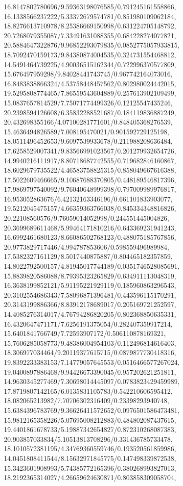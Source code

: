 {16.8147802780696/9.59363198076585/0.791245161558866,
16.1338566237222/5.33372679574781/0.851980109062184,
18.8276613710978/8.25386669150998/0.631224705148792,
20.7268079355087/7.33491631088355/0.684228274077821,
20.5884647322876/9.96852293079835/0.0852775057933815,
18.7092470159173/9.84380874004535/0.324731554468812,
14.5491464739225/4.90036515162344/0.722996370577809,
15.676497959298/9.84028441743745/0.967742164073016,
16.8483838866324/4.53758448457562/0.802980024442015,
19.5295808774465/7.86559543604889/0.257613902109499,
15.0837657814529/7.75071774499326/0.12125547435246,
20.2398594126608/6.35832288521687/0.184119836887249,
20.432698355166/4.07100281771601/0.848405368276539,
15.4636494826589/7.008195470021/0.901592729125198,
18.0511496452653/9.6097539933678/0.211988208636484,
17.6258529007341/9.83566991023567/0.201279932654726,
14.9940216111917/8.80718687742555/0.719682846160867,
18.6029679735522/4.46583758825315/0.858049667616388,
17.5022609466665/9.10687688370805/0.448189546817396,
17.9869797540092/9.76040648999398/0.797009989976817,
16.953052863676/6.42132163346196/0.661101833903077,
19.5212045475157/4.66359363766038/0.845334348816826,
20.22108560576/9.76059014052998/0.244551445004826,
20.3699689611468/5.99464171810216/0.643369231941243,
16.6992461680123/8.66086502768123/0.488075185767856,
20.9773829717446/4.994787853606/0.598559496989984,
17.5382327161129/8.5017440875887/0.804465182357859,
14.8022792500157/4.81945017744189/0.0351746528085691,
15.8839820586088/8.79395323265829/0.634911113048319,
16.3638199852121/5.91195221929119/0.185960863296543,
20.3102554686343/7.58096871396481/0.443596115170291,
20.3143199886366/8.83912178689017/0.205169721252597,
14.4085276314017/4.76794286820205/0.802368850635331,
16.4320647471171/7.6256191375054/0.282407359917214,
15.6401841766749/7.72593907172/0.506110878169321,
15.7606285058773/9.48386004954103/0.112496814616403,
18.306977034464/9.20119377615715/0.0879877730418316,
19.8392233383153/7.14779057645553/0.0516466577267024,
19.0400897886468/9.94426673390045/0.957202621251811,
14.9630345277469/7.30698014445097/0.0783823429459989,
17.8719807142165/6.0135831105783/0.542210606595412,
18.082065213982/7.70706302316409/0.23398293940748,
15.6384396783769/9.36626411572652/0.0976501586473481,
15.9812165358226/5.07695008212883/0.484802087437615,
19.4401861678733/5.19887342654827/0.872310268087383,
20.903857033834/5.10513813708296/0.331436785733478,
18.1010572381195/4.34769360559746/0.193520561859986,
14.0451808411544/8.15632971845775/0.147498339872538,
15.3423601908993/5.74385772165396/0.380268993827013,
18.2192365314027/4.26659624630871/0.803858309058704,
}
